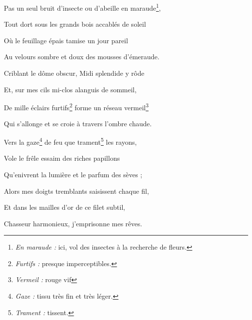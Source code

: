 	{\setlength{\parskip}{0pt}
	
Pas un seul bruit d’insecte ou d’abeille en maraude\footnote{\emph{En maraude :} ici, vol des insectes à la recherche de fleurs.},

Tout dort sous les grands bois accablés de soleil

Où le feuillage épais tamise un jour pareil

Au velours sombre et doux des mousses d’émeraude.

\medskip

Criblant le dôme obscur, Midi splendide y rôde

Et, sur mes cils mi-clos alanguis de sommeil,

De mille éclairs furtifs\footnote{\emph{Furtifs :} presque imperceptibles.} forme un réseau vermeil\footnote{\emph{Vermeil :} rouge vif}

Qui s’allonge et se croie à travers l’ombre chaude.

\medskip

Vers la gaze\footnote{\emph{Gaze :} tissu très fin et très léger.} de feu que trament\footnote{\emph{Trament :} tissent.} les rayons,

Vole le frêle essaim des riches papillons

Qu’enivrent la lumière et le parfum des sèves ;

\medskip

Alors mes doigts tremblants saisissent chaque fil,

Et dans les mailles d’or de ce filet subtil,

Chasseur harmonieux, j’emprisonne mes rêves.
	\setlength{\parskip}{6pt}}


